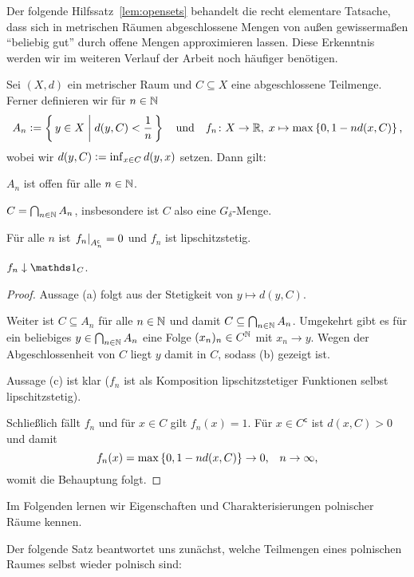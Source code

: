 \documentclass[../main/main.tex]{subfiles}
\begin{document}
	Der folgende Hilfssatz~\ref{lem:opensets} behandelt die recht elementare Tatsache, dass sich in metrischen Räumen 
	abgeschlossene Mengen von außen gewissermaßen \enquote{beliebig gut} durch offene Mengen approximieren lassen. 
	Diese Erkenntnis werden wir im weiteren Verlauf der Arbeit noch häufiger benötigen.
	
	\begin{Hilfssatz}
		\label{lem:opensets}
		Sei $(X, d)$ ein metrischer Raum und $C \subseteq X$ eine abgeschlossene 
		Teilmenge. Ferner definieren wir für $n \in \mathbb{N}$
		$$ A_n \vcentcolon = \left\{\, y \in X \; \middle| \; d(y, C) < \frac{1}{n} \,\right\} \quad \text{und} \quad 
		f_n \colon X \to \mathbb{R}, \; x \mapsto \max \left\{0, 1-n d(x, C)\right\}  \text{,}$$
		wobei wir $d(y, C) \vcentcolon = \inf_{x \in C} d(y, x)$ setzen.
		Dann gilt:
		\begin{enumeratethm}
			\item $A_n$ ist offen für alle $n \in \mathbb{N}$.
			\item $C = \bigcap_{n \in \mathbb{N}} A_n$, insbesondere ist $C$ also eine $G_\delta$-Menge.
			\item Für alle $n$ ist $\left.f_n\right|_{A_n^\mathsf{c}} = 0$ und $f_n$ ist lipschitzstetig.
			\item $f_n \convdown \indfct_C$.
		\end{enumeratethm}
	\end{Hilfssatz}
	
	\begin{proof}
		Aussage (a) folgt aus der Stetigkeit von $y \mapsto d(y, C)$.
		
		Weiter ist $C \subseteq A_n$ für alle $n \in \mathbb{N}$ und damit 
		$C \subseteq \bigcap_{n \in \mathbb{N}} A_n$. 
		Umgekehrt gibt es für ein beliebiges $y \in \bigcap_{n \in \mathbb{N}} A_n$
		eine Folge $(x_n)_n \in C^{\mathbb{N}}$ mit $x_n \rightarrow y$. 
		Wegen der Abgeschlossenheit von $C$ liegt $y$ damit in $C$, sodass (b) gezeigt ist.
		
		Aussage (c) ist klar ($f_n$ ist als Komposition 
		lipschitzstetiger Funktionen selbst lipschitzstetig).
		
		Schließlich fällt $f_n$ und für $x \in C$ gilt $f_n(x) = 1$. 
		Für $x \in C^\mathsf{c}$ ist $d(x, C) > 0$ und damit
		$$f_n(x) = \max \left\{0, 1-n d(x, C)\right\} 
		\to 0 \text{,} \quad n \to \infty \text{,}$$
		womit die Behauptung folgt.
	\end{proof}

	Im Folgenden lernen wir Eigenschaften und Charakterisierungen polnischer Räume kennen.
	
	Der folgende Satz beantwortet uns zunächst, welche Teilmengen eines polnischen Raumes selbst wieder polnisch sind:
\end{document}
